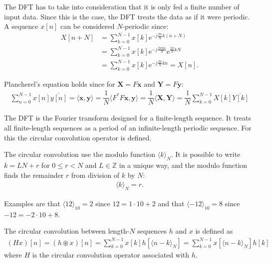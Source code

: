 The DFT has to take into consideration that it is only fed a finite number of input data. Since this is the case, the DFT treats the data as if it were periodic. A sequence $x[n]$ can be considered $N$-periodic since:
\begin{align*}
	X[n+N]
	&= \sum_{k=0}^{N-1} x[k] \text{e}^{-j \frac{2 \pi}{N}  k (n		+N)} \\
	&= \sum_{k=0}^{N-1} x[k] \text{e}^{-j \frac{2 \pi k n}{N}}		\text{e}^{\frac{2 \pi}{N} kN} \\
	&= \sum_{k=0}^{N-1} x[k] \text{e}^{-j \frac{2 \pi}{N} k n} 		= X[n].
\end{align*}

Plancherel's equation holds since for $\textbf{X} = F\textbf{x}$ and $\textbf{Y} = F\textbf{y}$:
\begin{align*}
\sum_{n=0}^{N-1} x[n] \overline{y[n]} = \langle \textbf{x},\textbf{y} \rangle = \dfrac{1}{N} \langle F^*F\textbf{x},\textbf{y} \rangle = \dfrac{1}{N} \langle \textbf{X},\textbf{Y} \rangle = \dfrac{1}{N} \sum_{k=0}^{N-1} X[k] \overline{Y[k]}
\end{align*}

The DFT is the Fourier transform designed for a finite-length sequence.
It treats all finite-length sequences as a period of an infinite-length periodic sequence.
For this the circular convolution operator is defined.  


The circular convolution use the modulo function $\langle k\rangle_N$. It is possible to write $k = LN+r$ for $0 \leq r < N$ and $L \in \mathbb{Z}$ in a unique way, and the modulo function finds the remainder $r$ from division of $k$ by $N$:
\begin{align*}
\langle k \rangle_N = r.
\end{align*}

Examples are that $\langle 12 \rangle_{10} = 2$ since $12 = 1 \cdot 10 + 2$ and that $\langle -12 \rangle_{10} = 8$ since $-12 = -2 \cdot 10 + 8$.

\begin{definition}
 	The circular convolution between length-$N$ sequences $h$ 		and $x$ is defined as
	\begin{align*}
	(Hx)[n] = (h \circledast x)[n] = \sum_{k = 0}^{N-1} x[k] 		h[\langle n-k\rangle_N] =\sum_{k = 0}^{N-1} x[\langle n-k		\rangle_N] h[k]
	\end{align*}
	where $H$ is the circular convolution operator associated 		with $h$.
\end{definition}


